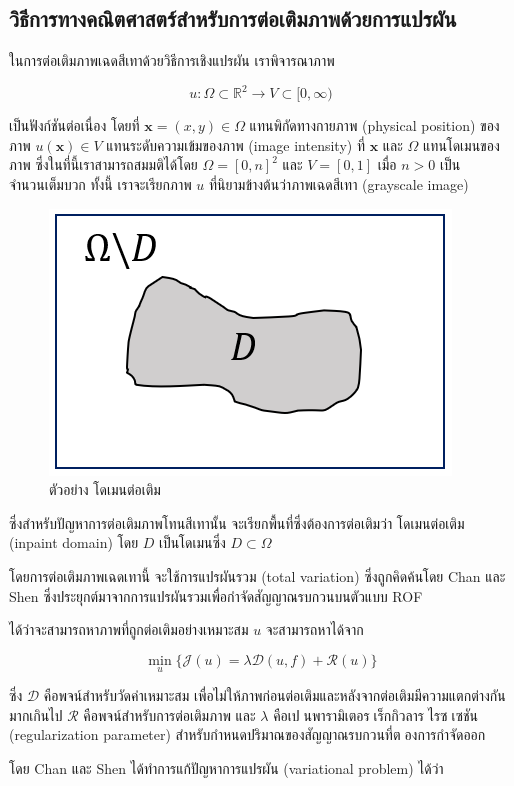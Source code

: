 \documentclass[hidelinks,a4paper,14pt]{article}
\numberwithin{equation}{section}							%
\begin{document}
{		\subsection{วิธีการทางคณิตศาสตร์สำหรับการต่อเติมภาพด้วยการแปรผัน}
		ในการต่อเติมภาพเฉดสีเทาด้วยวิธีการเชิงแปรผัน เราพิจารณาภาพ
		
		$$ u : \Omega \subset \mathbb{R}^2 \rightarrow V \subset [0,\infty) $$
		
		เป็นฟังก์ชันต่อเนื่อง โดยที่ $ \mathbf{x} = (x,y) \in \Omega $ แทนพิกัดทางกายภาพ (physical position) ของภาพ $ u(\mathbf{x}) \in V $ แทนระดับความเข้มของภาพ (image intensity) ที่ $ \mathbf{x} $ และ $ \Omega $ แทนโดเมนของภาพ ซึ่งในที่นี้เราสามารถสมมติได้โดย $ \Omega = [0,n]^2 $ และ $ V = [0,1] $ เมื่อ $n>0$ เป็นจำนวนเต็มบวก ทั้งนี้ เราจะเรียกภาพ $u$ ที่นิยามข้างต้นว่าภาพเฉดสีเทา (grayscale image)
			\begin{figure}[H]
			\centering
			\includegraphics[width=0.4\linewidth]{images/sample-domain.png}
			\caption{ตัวอย่าง โดเมนต่อเติม}
		\end{figure}
		ซึ่งสำหรับปัญหาการต่อเติมภาพโทนสีเทานั้น จะเรียกพื้นที่ซึ่งต้องการต่อเติมว่า โดเมนต่อเติม (inpaint domain) โดย $D$ เป็นโดเมนซึ่ง $D \subset \Omega$ 
		
		โดยการต่อเติมภาพเฉดเทานี้ จะใช้การแปรผันรวม (total variation) ซึ่งถูกคิดค้นโดย Chan และ Shen \cite{ref:rof-inpaint-chan-shen} ซึ่งประยุกต์มาจากการแปรผันรวมเพื่อกำจัดสัญญาณรบกวนบนตัวแบบ ROF \cite{ref:ROF-template}
		
		ได้ว่าจะสามารถหาภาพที่ถูกต่อเติมอย่างเหมาะสม $u$ จะสามารถหาได้จาก
		
			$$\min_{u} \{ \mathcal{J}(u)= \lambda \mathcal{D}(u,f)+  \mathcal{R}(u) \}$$
		
		ซึ่ง $ \mathcal{D} $ คือพจน์สำหรับวัดค่าเหมาะสม เพื่อไม่ให้ภาพก่อนต่อเติมและหลังจากต่อเติมมีความแตกต่างกันมากเกินไป $ \mathcal{R} $ คือพจน์สำหรับการต่อเติมภาพ และ $ \lambda $  คือเปนพารามิเตอรเร็กกิวลารไรซเซชัน (regularization parameter) สำหรับกำหนดปริมาณของสัญญาณรบกวนที่ตองการกำจัดออก 
		
		โดย Chan และ Shen ได้ทำการแก้ปัญหาการแปรผัน (variational problem) ได้ว่า
		
}
\end{document}
